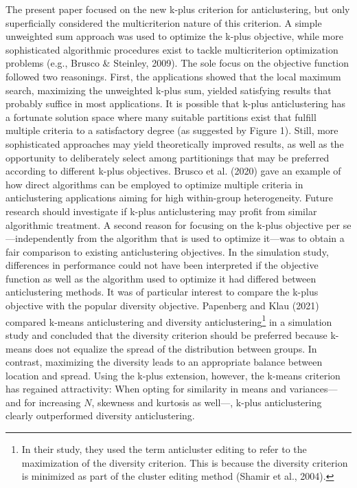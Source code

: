 \documentclass[
  man,floatsintext]{apa7}
\begin{document}
The present paper focused on the new k-plus criterion for anticlustering, but only superficially considered the multicriterion nature of this criterion. A simple unweighted sum approach was used to optimize the k-plus objective, while more sophisticated algorithmic procedures exist to tackle multicriterion optimization problems (e.g., Brusco \& Steinley, 2009). The sole focus on the objective function followed two reasonings. First, the applications showed that the local maximum search, maximizing the unweighted k-plus sum, yielded satisfying results that probably suffice in most applications. It is possible that k-plus anticlustering has a fortunate solution space where many suitable partitions exist that fulfill multiple criteria to a satisfactory degree (as suggested by Figure 1). Still, more sophisticated approaches may yield theoretically improved results, as well as the opportunity to deliberately select among partitionings that may be preferred according to different k-plus objectives. Brusco et al. (2020) gave an example of how direct algorithms can be employed to optimize multiple criteria in anticlustering applications aiming for high within-group heterogeneity. Future research should investigate if k-plus anticlustering may profit from similar algorithmic treatment. A second reason for focusing on the k-plus objective per se---independently from the algorithm that is used to optimize it---was to obtain a fair comparison to existing anticlustering objectives. In the simulation study, differences in performance could not have been interpreted if the objective function as well as the algorithm used to optimize it had differed between anticlustering methods. It was of particular interest to compare the k-plus objective with the popular diversity objective. Papenberg and Klau (2021) compared k-means anticlustering and diversity anticlustering\footnote{In their study, they used the term anticluster editing to refer to the maximization of the diversity criterion. This is because the diversity criterion is minimized as part of the cluster editing method (Shamir et al., 2004).} in a simulation study and concluded that the diversity criterion should be preferred because k-means does not equalize the spread of the distribution between groups. In contrast, maximizing the diversity leads to an appropriate balance between location and spread. Using the k-plus extension, however, the k-means criterion has regained attractivity: When opting for similarity in means and variances---and for increasing \(N\), skewness and kurtosis as well---, k-plus anticlustering clearly outperformed diversity anticlustering.
\end{document}
